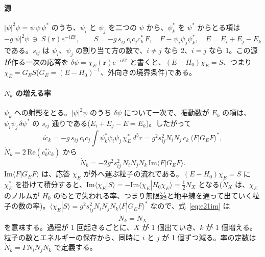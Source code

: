 \paragraph{源}
$|\psi|^2\psi=\psi\,\psi\,\psi^*$ のうち、$\psi_i$ と $\psi_j$ を二つの $\psi$ から、$\psi_k^*$ を $\psi^*$ からとる項は
\begin{equation}
-g|\psi|^2\psi\ \ni\ S(\mathbf r)e^{-iEt},\qquad S=-g\,s_{ij}\,c_ic_jc_k^*\,F,\quad F\equiv\psi_i\psi_j\psi_k^*,\quad E=E_i+E_j-E_k
\end{equation}
である。$s_{ij}$ は $\psi_i$、$\psi_j$ の割り当て方の数で、$i\ne j$ なら 2、$i=j$ なら 1。この源が作る一次の応答を $\delta\psi=\chi_E(\mathbf r)e^{-iEt}$ と書くと、$(E-H_0)\chi_E=S$、つまり $\chi_E=G_ES$($G_E=(E-H_0)^{-1}$、外向きの境界条件)である。

\paragraph{$N_k$ の増える率}
$\psi_k$ への射影をとる。$|\psi|^2\psi$ のうち $\delta\psi$ について一次で、振動数が $E_k$ の項は、$\psi_i\psi_j\,\delta\psi^*$ の $s_{ij}$ 通りである($E_i+E_j-E=E_k$)。したがって
\begin{equation}
i\dot c_k=-g\,s_{ij}\,c_ic_j\int\psi_k^*\psi_i\psi_j\,\chi_E^*\,d^3r=g^2s_{ij}^2N_iN_j\,c_k\,\langle F|G_EF\rangle^*,
\end{equation}
$\dot N_k=2\,\mathrm{Re}(c_k^*\dot c_k)$ から
\begin{equation}
\dot N_k=-2g^2s_{ij}^2\,N_iN_jN_k\,\mathrm{Im}\langle F|G_EF\rangle.
\label{eq:e21im}
\end{equation}
$\mathrm{Im}\langle F|G_EF\rangle$ は、応答 $\chi_E$ が外へ運ぶ粒子の流れである。$(E-H_0)\chi_E=S$ に $\chi_E^*$ を掛けて積分すると、$\mathrm{Im}\langle\chi_E|S\rangle=-\mathrm{Im}\langle\chi_E|H_0\chi_E\rangle=\frac12\dot N_X$ となる($\dot N_X$ は、$\chi_E$ のノルムが $H_0$ のもとで失われる率、つまり無限遠と地平線を通って出ていく粒子の数の率)。$\langle\chi_E|S\rangle=g^2s_{ij}^2N_iN_jN_k\langle F|G_EF\rangle^*$ なので、式~\eqref{eq:e21im} は
\begin{equation}
\dot N_k=\dot N_X
\end{equation}
を意味する。過程が 1 回起きるごとに、$X$ が 1 個出ていき、$k$ が 1 個増える。粒子の数とエネルギーの保存から、同時に $i$ と $j$ が 1 個ずつ減る。率の定数は $\dot N_k=\Gamma N_iN_jN_k$ で定義する。

